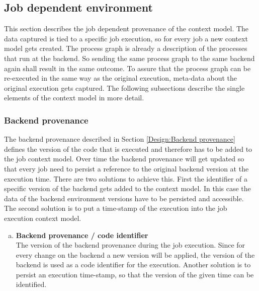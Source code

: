 \documentclass[draft,final]{vutinfth} %
\begin{document}
\subsection{Job dependent environment}\label{Design:Job dependent provenance}
This section describes the job dependent provenance of the context model. The data captured is tied to a specific job execution, so for every job a new context model gets created. The process graph is already a description of the processes that run at the backend. So sending the same process graph to the same backend again shall result in the same outcome. To assure that the process graph can be re-executed in the same way as the original execution, meta-data about the original execution gets captured. 
The following subsections describe the single elements of the context model in more detail. 

\subsubsection{Backend provenance}\label{Job:Backend provenance}
The backend provenance described in Section \ref{Design:Backend provenance} defines the version of the code that is executed and therefore has to be added to the job context model. Over time the backend provenance will get updated so that every job need to persist a reference to the original backend version at the execution time. There are two solutions to achieve this. First the identifier of a specific version of the backend gets added to the context model. In this case the data of the backend environment versions have to be persisted and accessible. The second solution is to put a time-stamp of the execution into the job execution context model.

\begin{enumerate}[(b)]
	\item \textbf{Backend provenance / code identifier} \\
	The version of the backend provenance during the job execution. Since for every change on the backend a new version will be applied, the version of the backend is used as a code identifier for the execution. Another solution is to persist an execution time-stamp, so that the version of the given time can be identified.
\end{enumerate}
\end{document}
